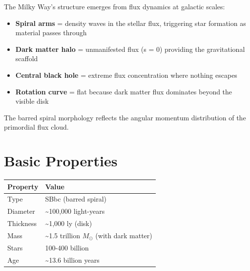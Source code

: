 \documentclass[
  11pt,
  letterpaper,
  twoside,
  openright]{book}
\providecommand{\tightlist}{%
  \setlength{\itemsep}{0pt}\setlength{\parskip}{0pt}}
\begin{document}
\begin{tcolorbox}[enhanced jigsaw, coltitle=black, colbacktitle=quarto-callout-note-color!10!white, toprule=.15mm, colframe=quarto-callout-note-color-frame, arc=.35mm, opacityback=0, bottomtitle=1mm, toptitle=1mm, breakable, colback=white, titlerule=0mm, opacitybacktitle=0.6, title=\textcolor{quarto-callout-note-color}{\faInfo}\hspace{0.5em}{How FTD Produces Galactic Structure}, rightrule=.15mm, bottomrule=.15mm, leftrule=.75mm, left=2mm]

The Milky Way's structure emerges from flux dynamics at galactic scales:

\begin{itemize}
\tightlist
\item
  \textbf{Spiral arms} = density waves in the stellar flux, triggering
  star formation as material passes through
\item
  \textbf{Dark matter halo} = unmanifested flux (s = 0) providing the
  gravitational scaffold
\item
  \textbf{Central black hole} = extreme flux concentration where nothing
  escapes
\item
  \textbf{Rotation curve} = flat because dark matter flux dominates
  beyond the visible disk
\end{itemize}

The barred spiral morphology reflects the angular momentum distribution
of the primordial flux cloud.

\end{tcolorbox}

\section{Basic Properties}\label{basic-properties}

\begin{longtable}[]{@{}ll@{}}
\toprule\noalign{}
Property & Value \\
\midrule\noalign{}
\endhead
\bottomrule\noalign{}
\endlastfoot
Type & SBbc (barred spiral) \\
Diameter & \textasciitilde100,000 light-years \\
Thickness & \textasciitilde1,000 ly (disk) \\
Mass & \textasciitilde1.5 trillion \(M_\odot\) (with dark matter) \\
Stars & 100-400 billion \\
Age & \textasciitilde13.6 billion years \\
\end{longtable}
\end{document}
